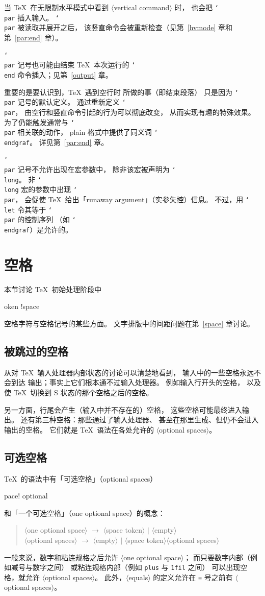 \documentclass[a4paper]{rapport3}
\def\nl{\protect\\}\def\n#1{{\tt #1}}\def\cs#1{{\tt\char`\\#1}}\let\csc\cs
\def\gr#1{$\langle$#1$\rangle$}\def\key#1{{\tt#1}}
\newenvironment{disp}{\begin{quotation}}{\end{quotation}}
\def\gram#1{\gr{#1}}%
\def\term#1\par{\index{#1}}
\begin{document}
当 \TeX\ 在无限制水平模式中看到 \gram{vertical command} 时，
也会把 \cs{par} 插入输入。
\cs{par} 被读取并展开之后，
该竖直命令会被重新检查（见第~\ref{hvmode}
章和第~\ref{par:end} 章）。

\cs{par} 记号也可能由结束 \TeX\ 本次运行的 \cs{end}
命令插入；见第~\ref{output} 章。

重要的是要认识到，\TeX\ 遇到空行时
所做的事（即结束段落）
只是因为 \cs{par} 记号的默认定义。
通过重新定义 \cs{par}，
由空行和竖直命令引起的行为可以彻底改变，
从而实现有趣的特殊效果。
为了仍能触发通常与 \cs{par} 相关联的动作，
plain 格式中提供了同义词 \cs{endgraf}。
详见第~\ref{par:end} 章。

\cs{par} 记号不允许出现在宏参数中，
除非该宏被声明为 \cs{long}。
非 \cs{long} 宏的参数中出现 \cs{par}，
会促使 \TeX\ 给出「runaway argument」（实参失控）信息。
不过，用 \cs{let} 令其等于 \cs{par} 的控制序列
（如 \cs{endgraf}）是允许的。

\section{空格}

本节讨论 \TeX\ 初始处理阶段中
\term token !space\par
空格字符与空格记号的某些方面。
文字排版中的间距问题在第~\ref{space} 章讨论。


\subsection{被跳过的空格}

从对 \TeX\ 输入处理器内部状态的讨论可以清楚地看到，
输入中的一些空格永远不会到达
\awp
输出；事实上它们根本通不过输入处理器。
例如输入行开头的空格，
以及使 \TeX\ 切换到 {\italic S} 状态的那个空格之后的空格。


另一方面，行尾会产生（输入中并不存在的）空格，
这些空格可能最终进入输出。
还有第三种空格：那些通过了输入处理器、
甚至在那里生成、但仍不会进入输出的空格。
它们就是 \TeX\ 语法在各处允许的 \gram{optional spaces}。

\subsection{可选空格}

\TeX\ 的语法中有「可选空格」（optional spaces）
\term space! optional \par
和「一个可选空格」（one optional space）的概念：
\begin{disp}\gr{one optional space} $\longrightarrow$
\gr{space token} $|$ \gr{empty}\nl
\gr{optional spaces} $\longrightarrow$
\gr{empty} $|$ \gr{space token}\gr{optional spaces}\end{disp}
一般来说，数字和粘连规格之后允许 \gr{one optional space}；
而只要数字内部（例如减号与数字之间）
或粘连规格内部（例如 \n{plus} 与 \n{1fil} 之间）
可以出现空格，就允许 \gr{optional spaces}。
此外，\gr{equals} 的定义允许在 \n= 号之前有 \gr{optional spaces}。
\end{document}
